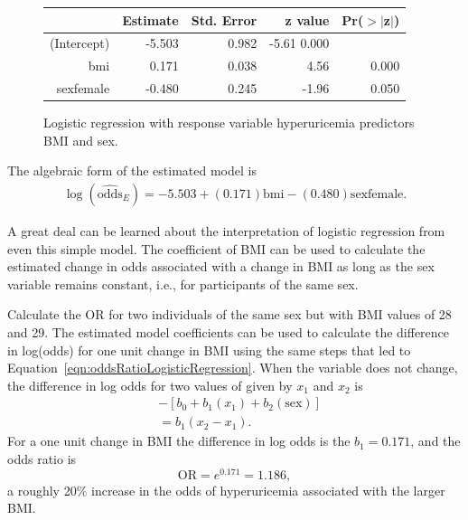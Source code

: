 \begin{figure}[ht]
\centering
\begin{tabular}{rrrrr}
  \hline
 & Estimate & Std. Error & z value & Pr($>$$|$z$|$) \\
  \hline
(Intercept) & -5.503 & 0.982 & -5.61 0.000 \\
  bmi & 0.171 & 0.038 & 4.56 & 0.000 \\
  sexfemale & -0.480 & 0.245 & -1.96 & 0.050 \\
   \hline
\end{tabular}
\caption{Logistic regression with response variable hyperuricemia
        predictors BMI and sex.}
\label{figure:huBmiSexLogReg}
\end{figure}

The algebraic form of the estimated model is
\begin{align}
  \log(\widehat{\text{odds}}_E) = -5.503 + (0.171)\text{bmi}
      -(0.480)\text{sexfemale}.
      \label{eqn:huBmiSexLogReg}
\end{align}

A great deal can be learned about the interpretation of logistic regression from even this simple model.  The coefficient of BMI can be used to calculate the estimated change in odds associated with a change in BMI as long as the sex variable remains constant, i.e., for participants of the same sex.

\begin{examplewrap} 
\begin{nexample}{Calculate the OR for two individuals of the same sex but with BMI values of 28 and 29.}
  The estimated model coefficients can be used to calculate the difference in log(odds) for one unit change in BMI using the same steps that led to Equation~\ref{eqn:oddsRatioLogisticRegression}.  When the variable  does not change, the difference in log odds for two values of  given by $x_1$ and $x_2$ is  
\begin{align}
  [b_0 + b_1(x_2) + b_2(\text{sex})] &- [b_0 + b_1(x_1) + b_2(\text{sex})] \\
      & = b_1(x_2 - x_1).
      \label{eqn:ORChangeTwoVar}
\end{align}
For a one unit change in BMI the difference in log odds is the $b_1 = 0.171$, and the odds ratio is
\[
  \text{OR} = e^{0.171} = 1.186,
\]
a roughly 20\% increase in the odds of hyperuricemia associated with the larger BMI.

\label{example:huBMISexOR}
\end{nexample}
\end{examplewrap}


